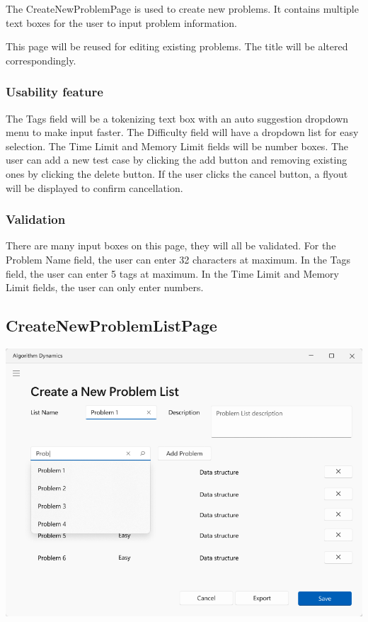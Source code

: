 \documentclass[a4paper]{report}
\begin{document}
The CreateNewProblemPage is used to create new problems. It contains multiple text boxes for the user to input problem information.

This page will be reused for editing existing problems. The title will be altered correspondingly.

\subsubsection{Usability feature}

The Tags field will be a tokenizing text box with an auto suggestion dropdown menu to make input faster. The Difficulty field will have a dropdown list for easy selection. The Time Limit and Memory Limit fields will be number boxes. The user can add a new test case by clicking the add button and removing existing ones by clicking the delete button. If the user clicks the cancel button, a flyout will be displayed to confirm cancellation.

\subsubsection{Validation}

There are many input boxes on this page, they will all be validated. For the Problem Name field, the user can enter 32 characters at maximum. In the Tags field, the user can enter 5 tags at maximum. In the Time Limit and Memory Limit fields, the user can only enter numbers.

\subsection{CreateNewProblemListPage}

\includegraphics[width=\textwidth, height=\textheight, keepaspectratio]{CreateNewProblemListPage-design}
\end{document}
